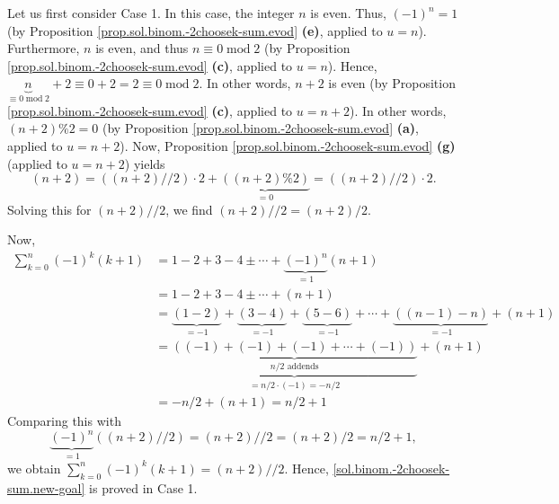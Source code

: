 \documentclass[paper=a4, fontsize=12pt]{scrartcl}%
\let\sumnonlimits\sum
\renewcommand{\sum}{\sumnonlimits\limits}
\theoremstyle{plainsl}
\theoremstyle{definition}
\theoremstyle{remark}
\begin{document}
Let us first consider Case 1. In this case, the integer $n$ is even. Thus,
$\left(  -1\right)  ^{n}=1$ (by Proposition
\ref{prop.sol.binom.-2choosek-sum.evod} \textbf{(e)}, applied to $u=n$).
Furthermore, $n$ is even, and thus $n\equiv0\operatorname{mod}2$ (by
Proposition \ref{prop.sol.binom.-2choosek-sum.evod} \textbf{(c)}, applied to
$u=n$). Hence, $\underbrace{n}_{\equiv0\operatorname{mod}2}+2\equiv
0+2=2\equiv0\operatorname{mod}2$. In other words, $n+2$ is even (by
Proposition \ref{prop.sol.binom.-2choosek-sum.evod} \textbf{(c)}, applied to
$u=n+2$). In other words, $\left(  n+2\right)  \%2=0$ (by Proposition
\ref{prop.sol.binom.-2choosek-sum.evod} \textbf{(a)}, applied to $u=n+2$).
Now, Proposition \ref{prop.sol.binom.-2choosek-sum.evod} \textbf{(g)} (applied
to $u=n+2$) yields
\[
\left(  n+2\right)  =\left(  \left(  n+2\right)  //2\right)  \cdot
2+\underbrace{\left(  \left(  n+2\right)  \%2\right)  }_{=0}=\left(  \left(
n+2\right)  //2\right)  \cdot2.
\]
Solving this for $\left(  n+2\right)  //2$, we find $\left(  n+2\right)
//2=\left(  n+2\right)  /2$.

Now,%
\begin{align*}
\sum_{k=0}^{n}\left(  -1\right)  ^{k}\left(  k+1\right)   &  =1-2+3-4\pm
\cdots+\underbrace{\left(  -1\right)  ^{n}}_{=1}\left(  n+1\right) \\
&  =1-2+3-4\pm\cdots+\left(  n+1\right) \\
&  =\underbrace{\left(  1-2\right)  }_{=-1}+\underbrace{\left(  3-4\right)
}_{=-1}+\underbrace{\left(  5-6\right)  }_{=-1}+\cdots+\underbrace{\left(
\left(  n-1\right)  -n\right)  }_{=-1}+\left(  n+1\right) \\
&  =\underbrace{\underbrace{\left(  \left(  -1\right)  +\left(  -1\right)
+\left(  -1\right)  +\cdots+\left(  -1\right)  \right)  }_{n/2\text{ addends}%
}}_{=n/2\cdot\left(  -1\right)  =-n/2}+\left(  n+1\right) \\
&  =-n/2+\left(  n+1\right)  =n/2+1
\end{align*}
Comparing this with%
\[
\underbrace{\left(  -1\right)  ^{n}}_{=1}\left(  \left(  n+2\right)
//2\right)  =\left(  n+2\right)  //2=\left(  n+2\right)  /2=n/2+1,
\]
we obtain $\sum_{k=0}^{n}\left(  -1\right)  ^{k}\left(  k+1\right)  =\left(
n+2\right)  //2$. Hence, \eqref{sol.binom.-2choosek-sum.new-goal} is proved in
Case 1.
\end{document}
